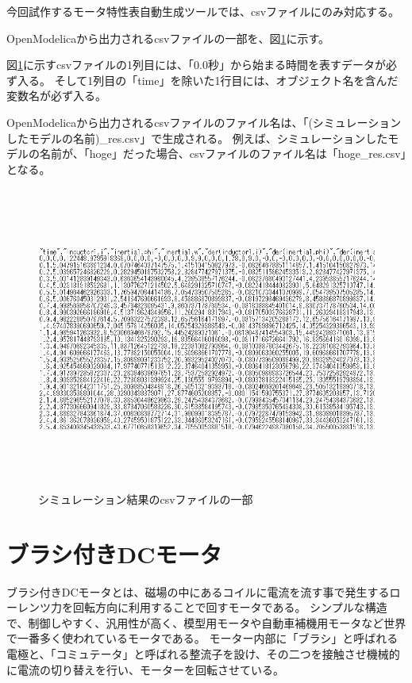 今回試作するモータ特性表自動生成ツールでは、csvファイルにのみ対応する。

OpenModelicaから出力されるcsvファイルの一部を、図\ref{fig:simyu_csv}に示す。

図\ref{fig:simyu_csv}に示すcsvファイルの1列目には、「0.0秒」から始まる時間を表すデータが必ず入る。
そして1列目の「time」を除いた1行目には、オブジェクト名を含んだ変数名が必ず入る。


OpenModelicaから出力されるcsvファイルのファイル名は、「(シミュレーションしたモデルの名前)\_res.csv」で生成される。
例えば、シミュレーションしたモデルの名前が、「hoge」だった場合、csvファイルのファイル名は「hoge\_res.csv」となる。
\begin{figure}[t]
	\centering
	\includegraphics[width=16.5cm,height=10cm]{./Image/simyu_csv.png}
	\caption{シミュレーション結果のcsvファイルの一部}
	\label{fig:simyu_csv}
\end{figure}
\section{ブラシ付きDCモータ}\label{bDCmotor}
ブラシ付きDCモータとは、磁場の中にあるコイルに電流を流す事で発生するローレンツ力を回転方向に利用することで回すモータである\cite{モータ原理}。
シンプルな構造で、制御しやすく、汎用性が高く、模型用モータや自動車補機用モータなど世界で一番多く使われているモータである\cite{モータ使う}。
モーター内部に「ブラシ」と呼ばれる電極と、「コミュテータ」と呼ばれる整流子を設け、その二つを接触させ機械的に電流の切り替えを行い、モーターを回転させている。
